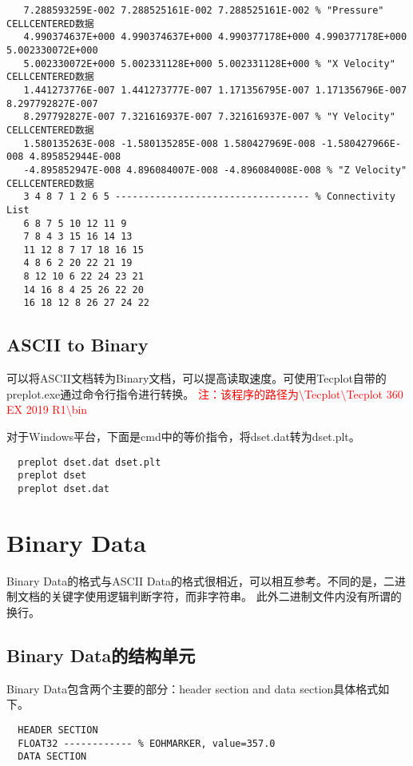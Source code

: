 \documentclass[lang=cn,11pt,a4paper]{elegantpaper}
\begin{document}
\begin{lstlisting}
   7.288593259E-002 7.288525161E-002 7.288525161E-002 % "Pressure" CELLCENTERED数据
   4.990374637E+000 4.990374637E+000 4.990377178E+000 4.990377178E+000 5.002330072E+000
   5.002330072E+000 5.002331128E+000 5.002331128E+000 % "X Velocity" CELLCENTERED数据
   1.441273776E-007 1.441273777E-007 1.171356795E-007 1.171356796E-007 8.297792827E-007
   8.297792827E-007 7.321616937E-007 7.321616937E-007 % "Y Velocity" CELLCENTERED数据
   1.580135263E-008 -1.580135285E-008 1.580427969E-008 -1.580427966E-008 4.895852944E-008
   -4.895852947E-008 4.896084007E-008 -4.896084008E-008 % "Z Velocity" CELLCENTERED数据
   3 4 8 7 1 2 6 5 ---------------------------------- % Connectivity List
   6 8 7 5 10 12 11 9
   7 8 4 3 15 16 14 13
   11 12 8 7 17 18 16 15
   4 8 6 2 20 22 21 19
   8 12 10 6 22 24 23 21
   14 16 8 4 25 26 22 20
   16 18 12 8 26 27 24 22
\end{lstlisting}

\subsection{ASCII to Binary}\label{ascii2binary}
可以将ASCII文档转为Binary文档，可以提高读取速度。可使用Tecplot自带的preplot.exe通过命令行指令进行转换。
\textcolor{red}{注：该程序的路径为$\setminus$Tecplot$\setminus$Tecplot 360 EX 2019 R1$\setminus$bin}

对于Windows平台，下面是cmd中的等价指令，将dset.dat转为dset.plt。
\begin{lstlisting}
  preplot dset.dat dset.plt
  preplot dset
  preplot dset.dat
\end{lstlisting}


\section{Binary Data}

Binary Data的格式与ASCII Data的格式很相近，可以相互参考。不同的是，二进制文档的关键字使用逻辑判断字符，而非字符串。
此外二进制文件内没有所谓的换行。

\subsection{Binary Data的结构单元}\label{binarydataunit}
Binary Data包含两个主要的部分：header section and data section具体格式如下。
\begin{lstlisting}
  HEADER SECTION
  FLOAT32 ------------ % EOHMARKER, value=357.0
  DATA SECTION
\end{lstlisting}
\end{document}
